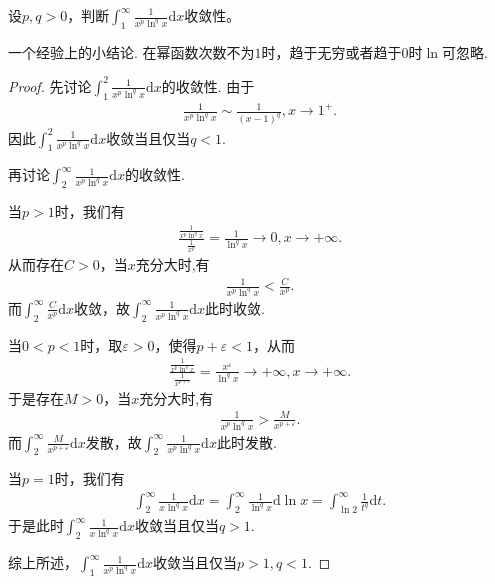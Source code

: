 \documentclass[../../main.tex]{subfiles}%
\begin{document}
\begin{example}
设\(p,q > 0\)，判断\(\int_{1}^{\infty}\frac{1}{x^p\ln^q x}\mathrm{d}x\)收敛性。 
\end{example}
\begin{note}
一个经验上的小结论. 在幂函数次数不为\(1\)时，趋于无穷或者趋于\(0\)时\(\ln\)可忽略.
\end{note}
\begin{proof}

先讨论\(\int_{1}^{2}\frac{1}{x^p\ln ^q x}\mathrm{d}x\)的收敛性. 由于
\begin{align*}
\frac{1}{x^p\ln ^q x}\sim\frac{1}{(x - 1)^q},x\rightarrow 1^+.
\end{align*}
因此\(\int_{1}^{2}\frac{1}{x^p\ln ^q x}\mathrm{d}x\)收敛当且仅当\(q < 1\).

再讨论\(\int_{2}^{\infty}\frac{1}{x^p\ln ^q x}\mathrm{d}x\)的收敛性.

\one 当\(p > 1\)时，我们有
\begin{align*}
\frac{\frac{1}{x^p\ln ^q x}}{\frac{1}{x^p}}=\frac{1}{\ln ^q x}\rightarrow 0,x\rightarrow +\infty.
\end{align*}
从而存在\(C > 0\)，当$x$充分大时,有
\begin{align*}
\frac{1}{x^p\ln ^q x}<\frac{C}{x^p}.
\end{align*}
而\(\int_{2}^{\infty}\frac{C}{x^p}\mathrm{d}x\)收敛，故\(\int_{2}^{\infty}\frac{1}{x^p\ln ^q x}\mathrm{d}x\)此时收敛.

\two 当\(0 < p < 1\)时，取\(\varepsilon > 0\)，使得\(p + \varepsilon < 1\)，从而
\begin{align*}
\frac{\frac{1}{x^p\ln ^q x}}{\frac{1}{x^{p + \varepsilon}}}=\frac{x^{\varepsilon}}{\ln ^q x}\rightarrow +\infty,x\rightarrow +\infty.
\end{align*}
于是存在\(M > 0\)，当$x$充分大时,有
\begin{align*}
\frac{1}{x^p\ln ^q x}>\frac{M}{x^{p + \varepsilon}}.
\end{align*}
而\(\int_{2}^{\infty}\frac{M}{x^{p + \varepsilon}}\mathrm{d}x\)发散，故\(\int_{2}^{\infty}\frac{1}{x^p\ln ^q x}\mathrm{d}x\)此时发散.

\three 当\(p = 1\)时，我们有
\begin{align*}
\int_{2}^{\infty}\frac{1}{x\ln ^q x}\mathrm{d}x=\int_{2}^{\infty}\frac{1}{\ln ^q x}\mathrm{d}\ln x=\int_{\ln 2}^{\infty}\frac{1}{t^q}\mathrm{d}t.
\end{align*}
于是此时\(\int_{2}^{\infty}\frac{1}{x\ln ^q x}\mathrm{d}x\)收敛当且仅当\(q > 1\).

综上所述，\(\int_{1}^{\infty}\frac{1}{x^p\ln ^q x}\mathrm{d}x\)收敛当且仅当\(p > 1,q < 1\). 

\end{proof}
\end{document}
